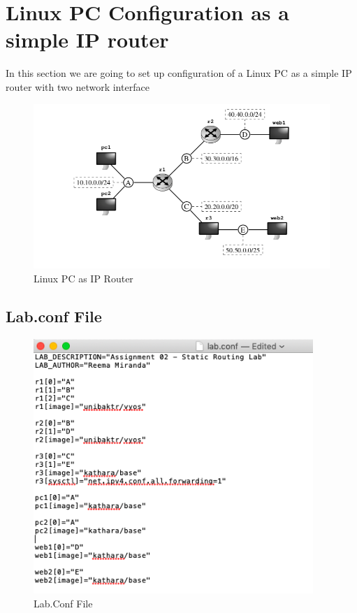 \label{Static Routing}
\chapter{Linux PC Configuration as a simple IP router}
In this section we are going to set up configuration of a Linux PC as a simple IP router with two network interface
\begin{figure}[H]
\centering
  \includegraphics[width=400pt]{Images/1.assignment.02.png}
  \caption{Linux PC as IP Router}
  \label{fig:2.33}
\end{figure}
\section{Lab.conf File}
\begin{figure}[H]
\centering
  \includegraphics[width=300pt]{Images/lab_static_routing.conf.png}
  \caption{Lab.Conf File}
  \label{fig:2.1}
\end{figure}
